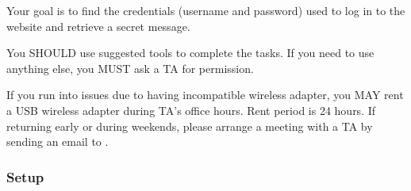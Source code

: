 \medskip

Your goal is to find the credentials (username and password) used to log in to the website and retrieve a secret message.

\medskip

You SHOULD use suggested tools to complete the tasks.
If you need to use anything else, you MUST ask a TA for permission.

\medskip

If you run into issues due to having incompatible wireless adapter, you MAY rent a USB wireless adapter during TA's office hours.
Rent period is 24 hours.
If returning early or during weekends, please arrange a meeting with a TA by sending an email to \staffemail.

\hypertarget{cp2setup}{\subsubsection*{Setup}}
